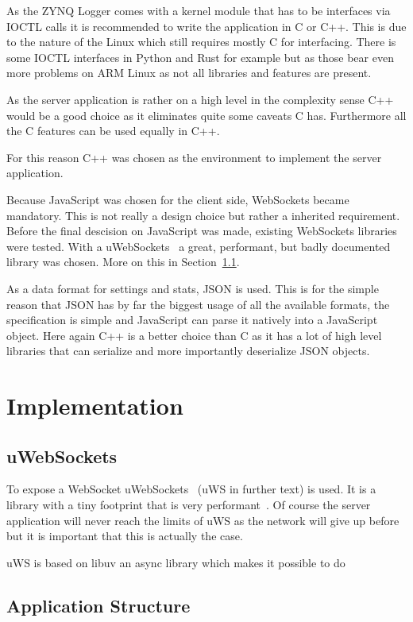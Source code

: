 As the ZYNQ Logger comes with a kernel module that has to be interfaces via IOCTL calls it is recommended to write the application in C or C++. This is due to the nature of the Linux which still requires mostly C for interfacing. There is some IOCTL interfaces in Python and Rust for example but as those bear even more problems on ARM Linux as not all libraries and features are present.

As the server application is rather on a high level in the complexity sense C++ would be a good choice as it eliminates quite some caveats C has. Furthermore all the C features can be used equally in C++.

For this reason C++ was chosen as the environment to implement the server application.

Because JavaScript was chosen for the client side, WebSockets became mandatory. This is not really a design choice but rather a inherited requirement. Before the final descision on JavaScript was made, existing WebSockets libraries were tested. With a uWebSockets~\cite{uws:github} a great, performant, but badly documented library was chosen. More on this in Section~\ref{subsec:server:uws}.

As a data format for settings and stats, JSON is used. This is for the simple reason that JSON has by far the biggest usage of all the available formats, the specification is simple and JavaScript can parse it natively into a JavaScript object.
Here again C++ is a better choice than C as it has a lot of high level libraries that can serialize and more importantly deserialize JSON objects.

\section{Implementation}
\label{sec:server:implementation}

\subsection{uWebSockets}
\label{subsec:server:uws}

To expose a WebSocket uWebSockets~\cite{uws:github} (uWS in further text) is used. It is a library with a tiny footprint that is very performant~\cite{uws:github}. Of course the server application will never reach the limits of uWS as the network will give up before but it is important that this is actually the case.

uWS is based on libuv an async library which makes it possible to do 

%
%

\subsection{Application Structure}
\label{subsec}